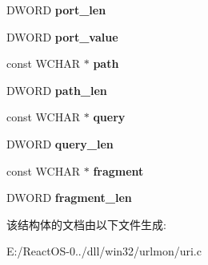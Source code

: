 \begin{DoxyCompactItemize}
\mbox{\label{structparse__data_a787eba82eaacb0663a8a0aa016a84aaa}} 
D\+W\+O\+RD {\bfseries port\+\_\+len}
\item 
\mbox{\label{structparse__data_a840966ea674624e8ae5c21b7a7f02ced}} 
D\+W\+O\+RD {\bfseries port\+\_\+value}
\item 
\mbox{\label{structparse__data_ace0be50dfe6c1d97f48fc4bb2cce2445}} 
const W\+C\+H\+AR $\ast$ {\bfseries path}
\item 
\mbox{\label{structparse__data_a436dee21f0ab634c514a4db4fe25fa15}} 
D\+W\+O\+RD {\bfseries path\+\_\+len}
\item 
\mbox{\label{structparse__data_ae031780da9a3d779f83d8bd73783216a}} 
const W\+C\+H\+AR $\ast$ {\bfseries query}
\item 
\mbox{\label{structparse__data_a10ccec76eab02c98f93eb0553cce599a}} 
D\+W\+O\+RD {\bfseries query\+\_\+len}
\item 
\mbox{\label{structparse__data_acf97ee444fa7647164d7a591d9d2abfb}} 
const W\+C\+H\+AR $\ast$ {\bfseries fragment}
\item 
\mbox{\label{structparse__data_ac3c0297157e47b8a83c7fc28568e670c}} 
D\+W\+O\+RD {\bfseries fragment\+\_\+len}
\end{DoxyCompactItemize}


该结构体的文档由以下文件生成\+:\begin{DoxyCompactItemize}
\item 
E\+:/\+React\+O\+S-\/0../dll/win32/urlmon/uri.\+c\end{DoxyCompactItemize}
